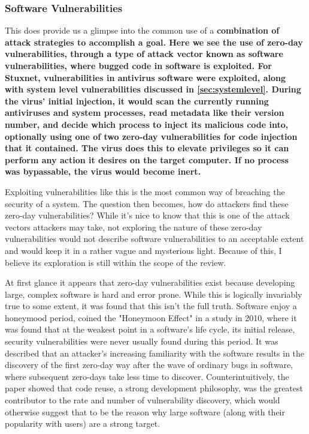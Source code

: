 \documentclass[a4paper, 11pt]{article}
\begin{document}
\subsubsection{Software Vulnerabilities}
\label{sec:softwarevul}
This does provide us a glimpse into the common use of a \bfseries combination \mdseries of attack strategies to accomplish a goal. Here we see the use of zero-day vulnerabilities, through a type of attack vector known as software vulnerabilities, where bugged code in software is exploited. \cite{ref:singer2014cybersecurity} For Stuxnet, vulnerabilities in antivirus software were exploited, along with system level vulnerabilities discussed in  \ref{sec:systemlevel}. During the virus' initial injection, it would scan the currently running antiviruses and system processes, read metadata like their version number, and decide which process to inject its malicious code into, optionally using one of two zero-day vulnerabilities for code injection that it contained. \cite{ref:stuxnet2011report} The virus does this to elevate privileges so it can perform any action it desires on the target computer. \cite{ref:stuxnet2011report} If no process was bypassable, the virus would become inert. \cite{ref:stuxnet2011report}

Exploiting vulnerabilities like this is the most common way of breaching the security of a system. \cite{ref:biometricattackvectors,ref:ibmbiometrics,ref:honeymoonsoftware} The question then becomes, how do attackers find these zero-day vulnerabilities? While it's nice to know that this is one of the attack vectors attackers may take, not exploring the nature of these zero-day vulnerabilities would not describe software vulnerabilities to an acceptable extent and would keep it in a rather vague and mysterious light. Because of this, I believe its exploration is still within the scope of the review.

At first glance it appears that zero-day vulnerabilities exist because developing large, complex software is hard and error prone. While this is logically invariably true to some extent, it was found that this isn't the full truth. Software enjoy a honeymood period, \cite{ref:honeymoonsoftware} coined the "Honeymoon Effect" in a study in 2010, where it was found that at the weakest point in a software's life cycle, its initial release, security vulnerabilities were never usually found during this period. It was described that an attacker's increasing familiarity with the software results in the discovery of the first zero-day way after the wave of ordinary bugs in software, where subsequent zero-days take less time to discover. Counterintuitively, the paper showed that code reuse, a strong development philosophy, was the greatest contributor to the rate and number of vulnerability discovery, which would otherwise suggest that to be the reason why large software (along with their popularity with users) are a strong target.
\end{document}
